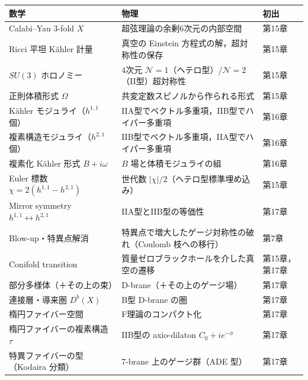 \begin{center}
\small
\begin{tabular}{p{}p{}p{}}
\textbf{数学} & \textbf{物理} & \textbf{初出}\\ \hline
Calabi–Yau 3-fold $X$ & 超弦理論の余剰6次元の内部空間 & 第15章\\
Ricci 平坦 Kähler 計量 & 真空の Einstein 方程式の解，超対称性の保存 & 第15章\\
$SU(3)$ ホロノミー & 4次元 $\mathcal N=1$（ヘテロ型）/$\mathcal N=2$（II型）超対称性 & 第15章\\
正則体積形式 $\Omega$ & 共変定数スピノルから作られる形式 & 第15章\\
Kähler モジュライ（$h^{1,1}$ 個） & IIA型でベクトル多重項，IIB型でハイパー多重項 & 第16章\\
複素構造モジュライ（$h^{2,1}$ 個） & IIB型でベクトル多重項，IIA型でハイパー多重項 & 第16章\\
複素化 Kähler 形式 $B+i\omega$ & $B$ 場と体積モジュライの組 & 第16章\\
Euler 標数 $\chi=2(h^{1,1}-h^{2,1})$ & 世代数 $|\chi|/2$（ヘテロ型標準埋め込み） & 第15章\\
Mirror symmetry $h^{1,1}\leftrightarrow h^{2,1}$ & IIA型とIIB型の等価性 & 第17章\\
Blow-up・特異点解消 & 特異点で増大したゲージ対称性の破れ（Coulomb 枝への移行） & 第7章\\
Conifold transition & 質量ゼロブラックホールを介した真空の遷移 & 第15章，第17章\\
部分多様体（＋その上の束） & D-brane（＋その上のゲージ場） & 第17章\\
連接層・導来圏 $D^b(X)$ & B型 D-brane の圏 & 第17章\\
楕円ファイバー空間 & F理論のコンパクト化 & 第17章\\
楕円ファイバーの複素構造 $\tau$ & IIB型の axio-dilaton $C_0+ie^{-\phi}$ & 第17章\\
特異ファイバーの型（Kodaira 分類） & 7-brane 上のゲージ群（ADE 型） & 第17章\\
\end{tabular}
\end{center}

